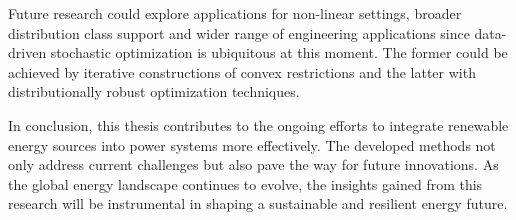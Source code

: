 Future research could explore applications for non-linear settings, broader distribution class support and wider range of engineering applications since data-driven stochastic optimization is ubiquitous at this moment. The former could be achieved by iterative constructions of convex restrictions and the latter with distributionally robust optimization techniques. 



In conclusion, this thesis contributes to the ongoing efforts to integrate renewable energy sources into power systems more effectively. The developed methods not only address current challenges but also pave the way for future innovations. As the global energy landscape continues to evolve, the insights gained from this research will be instrumental in shaping a sustainable and resilient energy future.





